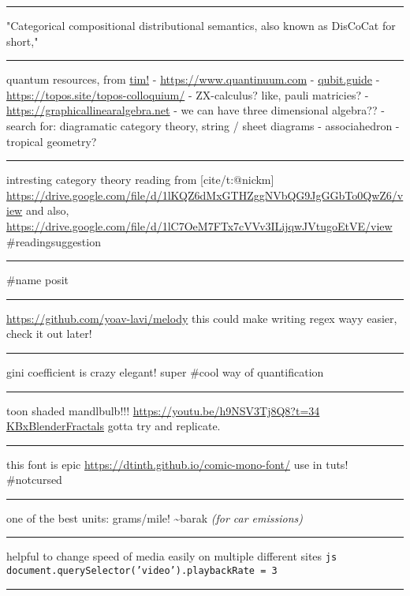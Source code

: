 \documentclass[letterpaper]{article}
\begin{document}
\noindent\rule{\textwidth}{0.5pt}

"Categorical compositional distributional semantics, also known as
DisCoCat for short,"

\noindent\rule{\textwidth}{0.5pt}

quantum resources, from \href{https://thosgood.com}{tim!} -
\url{https://www.quantinuum.com} - \href{https://qubit.guide}{qubit.guide} -
\url{https://topos.site/topos-colloquium/} - ZX-calculus? like, pauli
matricies? - \url{https://graphicallinearalgebra.net} - we can have three
dimensional algebra?? - search for: diagramatic category theory, string
/ sheet diagrams - associahedron - tropical geometry?

\noindent\rule{\textwidth}{0.5pt}

intresting category theory reading from [cite/t:@nickm]
\url{https://drive.google.com/file/d/1lKQZ6dMxGTHZggNVbQG9JgGGbTo0QwZ6/view}
and also,
\url{https://drive.google.com/file/d/1lC7OeM7FTx7cVVv3ILijqwJVtugoEtVE/view}
\#readingsuggestion

\noindent\rule{\textwidth}{0.5pt}

\#name posit

\noindent\rule{\textwidth}{0.5pt}

\url{https://github.com/yoav-lavi/melody} this could make writing regex wayy
easier, check it out later!

\noindent\rule{\textwidth}{0.5pt}

gini coefficient is crazy elegant! super \#cool way of quantification

\noindent\rule{\textwidth}{0.5pt}

toon shaded mandlbulb!!! \url{https://youtu.be/h9NSV3Tj8Q8?t=34}
\href{KBxBlenderFractals.org}{KBxBlenderFractals} gotta try and
replicate.

\noindent\rule{\textwidth}{0.5pt}

this font is epic \url{https://dtinth.github.io/comic-mono-font/} use in tuts!
\#notcursed

\noindent\rule{\textwidth}{0.5pt}

one of the best units: grams/mile! \textasciitilde{}barak \emph{(for car emissions)}

\noindent\rule{\textwidth}{0.5pt}

helpful to change speed of media easily on multiple different sites
\texttt{js document.querySelector('video').playbackRate = 3}

\noindent\rule{\textwidth}{0.5pt}
\end{document}
